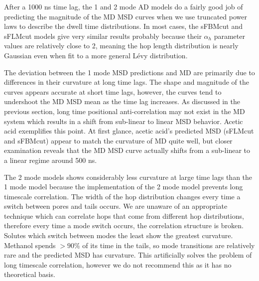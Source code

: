 \documentclass{article}
\begin{document}
  After a 1000 ns time lag, the 1 and 2 mode AD models do a fairly good job of 
  predicting the magnitude of the MD MSD curves when we use truncated power
  laws to describe the dwell time distributions. In most cases, the sFBMcut
  and sFLMcut models give very similar results probably because their $\alpha_h$
  parameter values are relatively close to 2, meaning the hop length distribution
  is nearly Gaussian even when fit to a more general L\'evy distribution. 
  
  The deviation between the 1 mode MSD predictions and MD are primarily due
  to differences in their curvature at long time lags. The shape and magnitude of the curves appears accurate 
  at short time lags, however, the curves tend to undershoot the MD MSD mean
  as the time lag increases. As discussed in the previous section, long time
  positional anti-correlation may not exist in the MD system which results 
  in a shift from sub-linear to linear MSD behavior. Acetic acid exemplifies
  this point. At first glance, acetic acid's predicted MSD (sFLMcut and sFBMcut)
  appear to match the curvature of MD quite well, but closer examination reveals
  that the MD MSD curve actually shifts from a sub-linear to a linear regime 
  around 500 ns.
  
  The 2 mode models shows considerably less curvature at large time lags than
  the 1 mode model because the implementation of the 2 mode model prevents long
  timescale correlation. The width of the hop distribution changes every time
  a switch between pores and tails occurs. We are unaware of an appropriate
  technique which can correlate hops that come from different hop distributions, 
  therefore every time a mode switch occurs, the correlation structure is 
  broken. Solutes which switch between modes the least show the greatest
  curvature. Methanol spends $> 90\%$ of its time in the tails, so mode transitions
  are relatively rare and the predicted MSD has curvature. This artificially
  solves the problem of long timescale correlation, however we do not recommend this
  as it has no theoretical basis.
  
  
\end{document}
